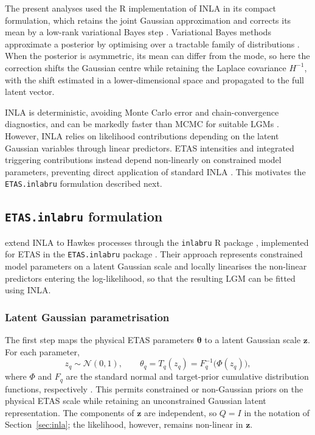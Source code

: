 \documentclass{statsmsc}
\begin{document}
The present analyses used the R implementation of INLA \citep[R-INLA;][]{lindgren2015bayesian} in its compact formulation, which retains the joint Gaussian approximation and corrects its mean by a low-rank variational Bayes step \citep{vanniekerk2023new, vanniekerk2024lowrank}. Variational Bayes methods approximate a posterior by optimising over a tractable family of distributions \citep{blei2017variational}. When the posterior is asymmetric, its mean can differ from the mode, so here the correction shifts the Gaussian centre while retaining the Laplace covariance $H^{-1}$, with the shift estimated in a lower-dimensional space and propagated to the full latent vector. 

INLA is deterministic, avoiding Monte Carlo error and chain-convergence diagnostics, and can be markedly faster than MCMC for suitable LGMs \citep{rue2009approximate}. However, INLA relies on likelihood contributions depending on the latent Gaussian variables through linear predictors. ETAS intensities and integrated triggering contributions instead depend non-linearly on constrained model parameters, preventing direct application of standard INLA \citep{lindgren2024inlabru}. This motivates the \texttt{ETAS.inlabru} formulation described next.

\subsection{\texttt{ETAS.inlabru} formulation} \label{sec:inlabru}

\citet{serafini2023approximation} extend INLA to Hawkes processes through the \texttt{inlabru} R package \citep{bachl2019inlabru}, implemented for ETAS in the \texttt{ETAS.inlabru} package \citep{naylor2023bayesian}. Their approach represents constrained model parameters on a latent Gaussian scale and locally linearises the non-linear predictors entering the log-likelihood, so that the resulting LGM can be fitted using INLA. 

\subsubsection{Latent Gaussian parametrisation} \label{sec:reparam}
The first step maps the physical ETAS parameters $\boldsymbol{\theta}$ to a latent Gaussian scale $\boldsymbol{z}$. For each parameter,
\begin{equation*} 
z_q \sim \mathcal{N}(0,1), \qquad \theta_q = T_q(z_q) = F_q^{-1}\big(\Phi(z_q)\big),
\end{equation*}
where $\Phi$ and $F_q$ are the standard normal and target-prior cumulative distribution functions, respectively \citep{serafini2023approximation}. This permits constrained or non-Gaussian priors on the physical ETAS scale while retaining an unconstrained Gaussian latent representation. The components of $\boldsymbol{z}$ are independent, so $Q = I$ in the notation of Section~\ref{sec:inla}; the likelihood, however, remains non-linear in $\boldsymbol{z}$.
\end{document}
